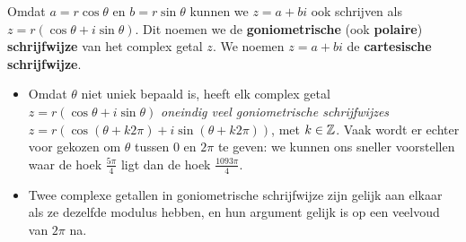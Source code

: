 \documentclass{ximera}
\begin{document}
 
 
%
 
 
 
Omdat $a=r \cos \theta$ en $b=r \sin \theta$ kunnen we $z=a+bi$ ook schrijven als $z=r(\cos\theta+i\sin\theta)$. Dit noemen we de \textbf{goniometrische} (ook \textbf{polaire}) \textbf{schrijfwijze} van het complex getal $z$. We noemen $z=a+bi$ de \textbf{cartesische schrijfwijze}.
 
 
 
\begin{remark}\nl
     
    \begin{itemize}
        \item Omdat $\theta$ niet uniek bepaald is, heeft elk complex getal $z = r(\cos\theta+i\sin\theta)$ \textit{oneindig veel goniometrische schrijfwijzes} $z = r\left(\cos(\theta+k2\pi)+i\sin(\theta+k2\pi) \right)$, met $k\in\mathbb{Z}$. Vaak wordt er echter voor gekozen om $\theta$ tussen 0 en $2\pi$ te geven: we kunnen ons sneller voorstellen waar de hoek $\frac{5\pi}{4}$ ligt dan de hoek $\frac{1093\pi}{4}$.
        \item Twee complexe getallen in goniometrische schrijfwijze zijn gelijk aan elkaar als ze dezelfde modulus hebben, en hun argument gelijk is op een veelvoud van $2\pi$ na.
    \end{itemize}
     
\end{remark}
 
\end{document}
